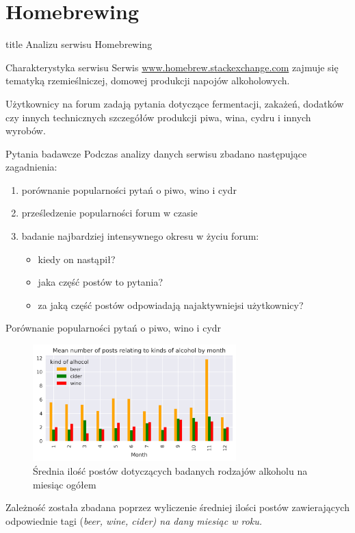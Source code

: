 \documentclass[./main.tex]{subfiles}
\begin{document}
\section{Homebrewing}

\begin{frame}
\vfill
\centering
\begin{beamercolorbox}[sep=8pt,center,shadow=true,rounded=true]{title}
     Analizu serwisu Homebrewing
\end{beamercolorbox}
\vfill
\end{frame}

\begin{frame}{Charakterystyka serwisu}
    Serwis \url{www.homebrew.stackexchange.com} zajmuje się tematyką rzemieślniczej, domowej produkcji napojów alkoholowych. 
    
    Użytkownicy na forum zadają pytania dotyczące fermentacji, zakażeń, dodatków czy innych technicznych szczegółów produkcji piwa, wina, cydru i innych wyrobów.
\end{frame}

\begin{frame}{Pytania badawcze}
    Podczas analizy danych serwisu zbadano następujące zagadnienia:
    \begin{enumerate}
        \item porównanie popularności pytań o piwo, wino i cydr
        \item prześledzenie popularności forum w czasie
        \item badanie najbardziej intensywnego okresu w życiu forum:
        \begin{itemize}
            \item kiedy on nastąpił?
            \item jaka część postów to pytania?
            \item za jaką część postów odpowiadają najaktywniejsi użytkownicy?
        \end{itemize}
    \end{enumerate}
\end{frame}

\begin{frame}{Porównanie popularności pytań o piwo, wino i cydr}
    \begin{figure}[t]
        \includegraphics[width=0.7\textwidth]{homebrewing/h1.png}
        \caption*{Średnia ilość postów dotyczących badanych rodzajów alkoholu na miesiąc ogółem}
    \end{figure}
    \small Zależność została zbadana poprzez wyliczenie średniej ilości postów zawierających odpowiednie tagi (\it{beer}, \it{wine}, \it{cider}) na dany miesiąc w roku.
\end{frame}
\end{document}
